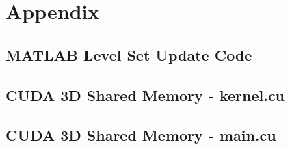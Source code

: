 \chapter{Appendix}


\section{MATLAB Level Set Update Code}
\lstset{language=matlab,basicstyle=\footnotesize}


\section{CUDA 3D Shared Memory - kernel.cu}
\lstset{language=c,basicstyle=\footnotesize}


\newpage
\section{CUDA 3D Shared Memory - main.cu}
\lstset{language=c,basicstyle=\footnotesize}
